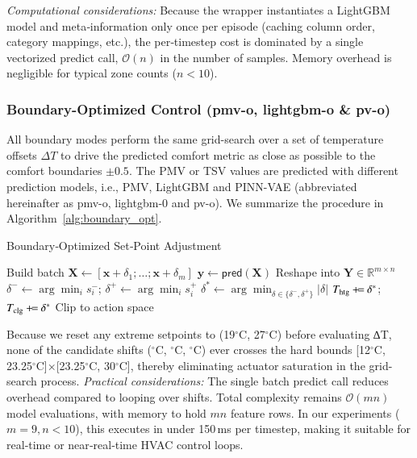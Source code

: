 \noindent\emph{Computational considerations:}  
Because the wrapper instantiates a LightGBM model and meta‐information only once per episode (caching column order, category mappings, etc.), the per‐timestep cost is dominated by a single vectorized predict call, \(\mathcal{O}(n)\) in the number of samples. Memory overhead is negligible for typical zone counts (\(n<10\)).


\subsubsection{Boundary-Optimized Control (pmv-o, lightgbm-o \& pv-o)}
\label{sec:opt_boundary_pseudocode}

All boundary modes perform the same grid-search over a set of temperature offsets \(\Delta T\) to drive the predicted comfort metric as close as possible to the comfort boundaries \(\pm0.5\). The PMV or TSV values are predicted with different prediction models, i.e., PMV, LightGBM and PINN-VAE (abbreviated hereinafter as pmv-o, lightgbm-0 and pv-o). We summarize the procedure in Algorithm~\ref{alg:boundary_opt}.

\begin{algorithm}[ht]
\caption{Boundary‐Optimized Set‐Point Adjustment}\label{alg:boundary_opt}
Build batch $\mathbf{X}\leftarrow[\mathbf{x}+\delta_1;\dots;\mathbf{x}+\delta_m]$\;
$\mathbf{y}\leftarrow\mathsf{pred}(\mathbf{X})$\;
Reshape into $\mathbf{Y}\in\mathbb{R}^{m\times n}$\;
$\delta^-\leftarrow\arg\min_i s_i^-$; $\delta^+\leftarrow\arg\min_i s_i^+$\;
$\delta^*\leftarrow\arg\min_{\delta\in\{\delta^-,\delta^+\}}|\delta|$\;
$T_\text{htg}\mathbin{+{\mkern-8mu}=}\delta^*$; $T_\text{clg}\mathbin{+{\mkern-8mu}=}\delta^*$\;
Clip to action space\;
\end{algorithm}

Because we reset any extreme setpoints to (19$^\circ$C, 27$^\circ$C) before evaluating ∆T, none of the candidate shifts ($^\circ$C, $^\circ$C, $^\circ$C) ever crosses the hard bounds [12$^\circ$C, 23.25$^\circ$C]×[23.25$^\circ$C, 30$^\circ$C], thereby eliminating actuator saturation in the grid-search process.
\noindent\emph{Practical considerations:}  
The single batch predict call reduces overhead compared to looping over shifts. Total complexity remains \(\mathcal{O}(mn)\) model evaluations, with memory to hold \(m\!n\) feature rows. In our experiments (\(m=9,n<10\)), this executes in under 150\,ms per timestep, making it suitable for real‐time or near‐real‐time HVAC control loops.

